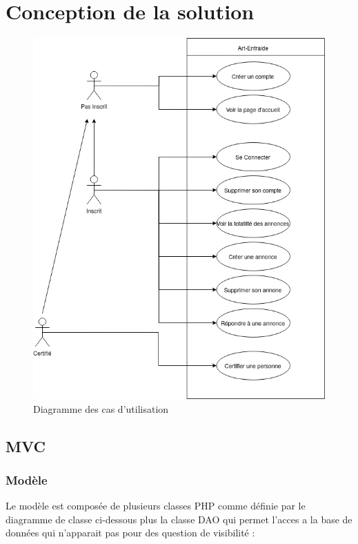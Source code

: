 \documentclass[a4paper,11pt]{article}
\begin{document}
\newpage
\section{Conception de la solution}

\begin{figure}[H]
  \includegraphics[width=\linewidth]{../Conception/DCU.png}
  \caption{Diagramme des cas d'utilisation}
  \label{fig:<un-label-court>}
\end{figure}

\subsection{MVC}
\subsubsection{Modèle}
Le modèle est composée de plusieurs classes PHP comme définie par le diagramme de classe ci-dessous
plus la classe DAO qui permet l'acces a la base de données qui n'apparait pas pour des question de visibilité :\\
\end{document}
